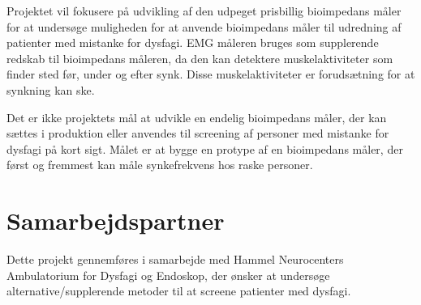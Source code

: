 Projektet vil fokusere på udvikling af den udpeget prisbillig bioimpedans måler for at undersøge muligheden for at anvende bioimpedans måler til udredning af patienter med mistanke for dysfagi. EMG måleren bruges som supplerende redskab til bioimpedans måleren, da den kan detektere muskelaktiviteter som finder sted før, under og efter synk. Disse muskelaktiviteter er forudsætning for at synkning kan ske. 

Det er ikke projektets mål at udvikle en endelig bioimpedans måler, der kan sættes i produktion eller anvendes til screening af personer med mistanke for dysfagi på kort sigt. Målet er at bygge en protype af en bioimpedans måler, der først og fremmest kan måle synkefrekvens hos raske personer. 

\section{Samarbejdspartner}
Dette projekt gennemføres i samarbejde med Hammel Neurocenters Ambulatorium for Dysfagi og Endoskop, der ønsker at undersøge alternative/supplerende metoder til at screene patienter med dysfagi.

